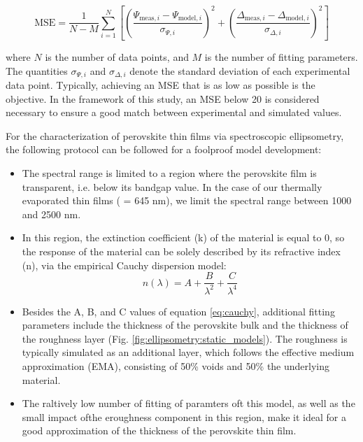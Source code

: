 \begin{equation}
\text{MSE} = \frac{1}{N - M} \sum_{i=1}^{N} \left[ \left( \frac{\Psi_{\text{meas},i} - \Psi_{\text{model},i}}{\sigma_{\Psi,i}} \right)^2 + \left( \frac{\Delta_{\text{meas},i} - \Delta_{\text{model},i}}{\sigma_{\Delta,i}} \right)^2 \right]
\label{eq:mse}
\end{equation}

where \( N \) is the number of data points, and \( M \) is the number of fitting parameters. The quantities \( \sigma_{\Psi,i} \) and \( \sigma_{\Delta,i} \) denote the standard deviation of each experimental data point. Typically, achieving an MSE that is as low as possible is the objective. In the framework of this study, an MSE below 20 is considered necessary to ensure a good match between experimental and simulated values. 


For the characterization of perovskite thin films via spectroscopic ellipsometry, the following protocol can be followed for a foolproof model development: 
\begin{itemize}
    \item The spectral range is limited to a region where the perovskite film is transparent, i.e. below its bandgap value. In the case of our thermally evaporated  thin films ( = 645 nm), we limit the spectral range between 1000 and 2500 nm. 
    \item In this region, the extinction coefficient (k) of the material is equal to 0, so the response of the material can be solely described by its refractive index (n), via the empirical Cauchy dispersion model:
        \begin{equation}
            n(\lambda) = A + \frac{B}{\lambda^2} + \frac{C}{\lambda^4}
            \label{eq:cauchy}
        \end{equation}
    \item Besides the A, B, and C values of equation \ref{eq:cauchy}, additional fitting parameters include the thickness of the perovskite bulk and the thickness of the roughness layer (Fig. \ref{fig:ellipsometry:static_models}). The roughness is typically simulated as an additional layer, which follows the effective medium approximation (EMA), consisting of 50\% voids and 50\% the underlying material. 
    \item The raltively low number of fitting of paramters oft this model, as well as the small impact ofthe eroughness component in this region, make it ideal for a good approximation of the thickness of the perovskite thin film. 

\end{itemize}


